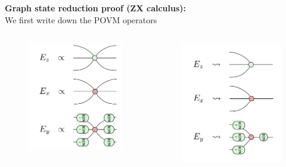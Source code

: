 \documentclass[aspectratio=169,xcolor=dvipsnames, t]{beamer}
\begin{document}
\begin{frame}
    \textbf{Graph state reduction proof (ZX calculus):}\\ We first write down the POVM operators
    \begin{columns}
        \begin{column}{0.45\textwidth}
          \begin{figure}
            \centering
            \includegraphics[width=.8\textwidth]{figures/povm_spiders_three_in_three_out.png}
          \end{figure}
        \end{column}
        \begin{column}{0.45\textwidth}  %
            \begin{figure}
                \centering
                \includegraphics[width=.8\textwidth]{figures/povm_spiders_three_in_one_out.png}

\end{figure}
\end{column}
\end{columns}
\end{frame}
\end{document}
